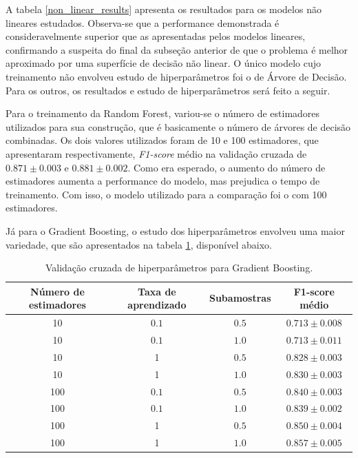 \documentclass{homework}
\begin{document}
A tabela \ref{non_linear_results} apresenta os resultados para os modelos não lineares estudados. Observa-se que a
performance demonstrada é consideravelmente superior que as apresentadas pelos modelos lineares, confirmando a
suspeita do final da subseção anterior de que o problema é melhor aproximado por uma superfície de decisão não linear.
O único modelo cujo treinamento não envolveu estudo de hiperparâmetros foi o de Árvore de Decisão. Para os outros, os
resultados e estudo de hiperparâmetros será feito a seguir.

Para o treinamento da Random Forest, variou-se o número de estimadores utilizados para sua construção, que é basicamente
o número de árvores de decisão combinadas. Os dois valores utilizados foram de 10 e 100 estimadores, que apresentaram
respectivamente, \textit{F1-score} médio na validação cruzada de $0.871 \pm 0.003$ e $0.881 \pm 0.002$. Como era
esperado, o aumento do número de estimadores aumenta a performance do modelo, mas prejudica o tempo de treinamento. Com
isso, o modelo utilizado para a comparação foi o com 100 estimadores.

Já para o Gradient Boosting, o estudo dos hiperparâmetros envolveu uma maior variedade, que são apresentados na tabela
\ref{gb_hiperparams}, disponível abaixo.

\begin{table}[h!]
    \centering
    \begin{tabular}{|c|c|c|c|}
        \hline
        \textbf{Número de estimadores} & \textbf{Taxa de aprendizado} & \textbf{Subamostras} & \textbf{F1-score médio} \\
        \hline
        10 & $0.1$ & $0.5$ & $0.713 \pm 0.008$ \\
        \hline
        10 & $0.1$ & $1.0$ & $0.713 \pm 0.011$ \\
        \hline
        10 & 1 & $0.5$ & $0.828 \pm 0.003$ \\
        \hline
        10 & 1 & $1.0$ & $0.830 \pm 0.003$ \\
        \hline
        100 & $0.1$ & $0.5$ & $0.840 \pm 0.003$ \\
        \hline
        100 & $0.1$ & $1.0$ & $0.839 \pm 0.002$ \\
        \hline
        100 & 1 & $0.5$ & $0.850 \pm 0.004$ \\
        \hline
        100 & 1 & $1.0$ & $0.857 \pm 0.005$ \\
        \hline
    \end{tabular}
    \caption{Validação cruzada de hiperparâmetros para Gradient Boosting.}
    \label{gb_hiperparams}
\end{table}
\end{document}
